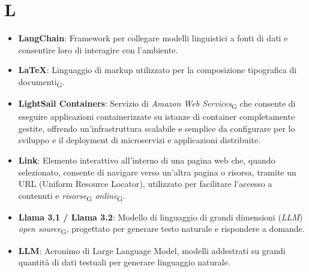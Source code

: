 \section*{L}  
\begin{itemize}
    \item \textbf{LangChain}: Framework per collegare modelli linguistici a fonti di dati e consentire loro di interagire con l'ambiente.
    \item \textbf{LaTeX}: Linguaggio di markup utilizzato per la composizione tipografica di documenti\textsubscript{G}.
    \item \textbf{LightSail Containers}: Servizio di \textit{Amazon Web Services}\textsubscript{G} che consente di eseguire applicazioni containerizzate su istanze di container completamente gestite, offrendo un'infrastruttura scalabile e semplice da configurare per lo sviluppo e il deployment di microservizi e applicazioni distribuite.
    \item \textbf{Link}: Elemento interattivo all'interno di una pagina web che, quando selezionato, consente di navigare verso un'altra pagina o risorsa, tramite un URL (Uniform Resource Locator), utilizzato per facilitare l'accesso a contenuti e \textit{risorse}\textsubscript{G} \textit{online}\textsubscript{G}.
    \item \textbf{Llama 3.1 / Llama 3.2}: Modello di linguaggio di grandi dimensioni (\textit{LLM}) \textit{open source}\textsubscript{G}, progettato per generare testo naturale e rispondere a domande.
    \item \textbf{LLM}: Acronimo di Large Language Model, modelli addestrati su grandi quantità di dati testuali per generare linguaggio naturale.
\end{itemize}
